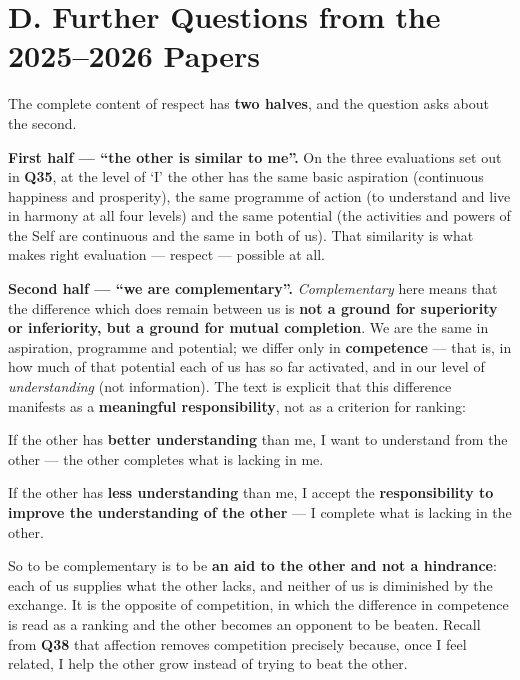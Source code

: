 \section{D. Further Questions from the 2025--2026 Papers}


\ans The complete content of respect has \textbf{two halves}, and the question
asks about the second.

\textbf{First half --- ``the other is similar to me''.} On the three
evaluations set out in \textbf{Q35}, at the level of `I' the other has the
same basic aspiration (continuous happiness and prosperity), the same
programme of action (to understand and live in harmony at all four levels) and
the same potential (the activities and powers of the Self are continuous and
the same in both of us). That similarity is what makes right evaluation ---
respect --- possible at all.

\textbf{Second half --- ``we are complementary''.} \emph{Complementary} here
means that the difference which does remain between us is \textbf{not a ground
for superiority or inferiority, but a ground for mutual completion}. We are
the same in aspiration, programme and potential; we differ only in
\textbf{competence} --- that is, in how much of that potential each of us has
so far activated, and in our level of \emph{understanding} (not information).
The text is explicit that this difference manifests as a \textbf{meaningful
responsibility}, not as a criterion for ranking:

\begin{apts}
\item If the other has \textbf{better understanding} than me, I want to
      understand from the other --- the other completes what is lacking in me.
\item If the other has \textbf{less understanding} than me, I accept the
      \textbf{responsibility to improve the understanding of the other} --- I
      complete what is lacking in the other.
\end{apts}

So to be complementary is to be \textbf{an aid to the other and not a
hindrance}: each of us supplies what the other lacks, and neither of us is
diminished by the exchange. It is the opposite of competition, in which the
difference in competence is read as a ranking and the other becomes an
opponent to be beaten. Recall from \textbf{Q38} that affection removes
competition precisely because, once I feel related, I help the other grow
instead of trying to beat the other.

